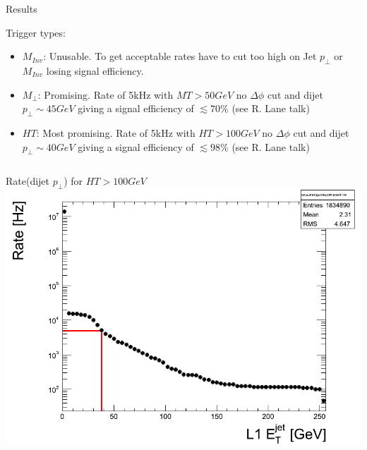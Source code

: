 \documentclass[8pt]{beamer}
\begin{document}
\begin{frame}{Results}

\begin{block}{Trigger types:}
  
  \begin{itemize}
    \item $M_{Inv}$: Unusable. To get acceptable rates have to cut too high on Jet $p_\bot$ or $M_{Inv}$ 
                     losing signal efficiency.
    \item $M_{\bot}$: Promising. Rate of 5kHz with $MT>50GeV$ no $\Delta\phi$ cut and dijet $p_\bot \sim 45GeV$
                      giving a signal efficiency of $\lesssim70\%$ (see R. Lane talk) 
    \item $HT$: Most promising. Rate of 5kHz with $HT>100GeV$ no $\Delta\phi$ cut and dijet $p_\bot \sim 40GeV$ giving 
                a signal efficiency of $\lesssim98\%$ (see R. Lane talk) 
  \end{itemize}

\end{block}

\begin{columns}

  \column[t]{5.0cm}
  \begin{block}{Rate(dijet $p_\bot$) for $HT>100GeV$}
    \includegraphics[width=1.00\textwidth]{img/PU28_5e33_RateFBDijetDEtaDPhi00HT100.png} 
  \end{block}


\end{columns}
\end{frame}
\end{document}
